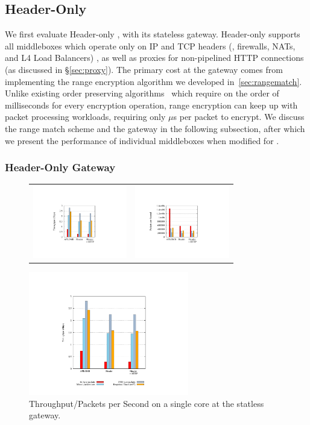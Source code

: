 \subsection{Header-Only \sys}
We first evaluate Header-only \sys, with its stateless gateway. 
Header-only \sys supports all middleboxes which operate only on IP and TCP headers (\eg{}, firewalls, NATs, and L4 Load Balancers) , as well as proxies for non-pipelined HTTP connections (as discussed in \S\ref{sec:proxy}).
The primary cost at the gateway comes from implementing the range encryption algorithm we developed in~\ref{sec:rangematch}. 
Unlike existing order preserving algorithms~\cite{mope,BCLO} which require on the order of milliseconds for every encryption operation, range encryption can keep up with packet processing workloads, requiring only $\mu$s per packet to encrypt.
We discuss the range match scheme and the gateway in the following subsection, after which we present the performance of individual middleboxes when modified for \sys.

\subsubsection{Header-Only Gateway}
\begin{figure}[t]
  \centering
  \begin{tabular}{cc}
  \includegraphics[height=1.25in]{fig/gatewayxput}&
  \includegraphics[height=1.25in]{fig/gateway_pps}\\
  \end{tabular}
  \includegraphics[width=2.75in]{fig/key}
  \vspace{-10pt}
  \caption[]{\label{fig:gwxput} Throughput/Packets per Second on a single core at the statless gateway.}
\end{figure}

